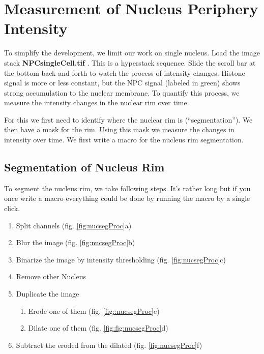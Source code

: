 \section{Measurement of Nucleus Periphery Intensity}

To simplify the development, we limit our work on single nucleus. Load the image stack \textbf{NPCsingleCell.tif} . This is a hyperstack sequence. Slide the scroll bar at the bottom back-and-forth to watch the process of intensity changes. Histone signal is more or less constant, but the NPC signal (labeled in green) shows strong accumulation to the nuclear membrane. To quantify this process, we measure the intensity changes in the nuclear rim over time.

For this we first need to identify where the nuclear rim is (``segmentation''). We then have a mask for the rim. Using this mask we measure the changes in intensity over time. We first write a macro for the nucleus rim segmentation.

\subsection{Segmentation of Nucleus Rim}

To segment the nucleus rim, we take following steps. It's rather long but if you once write a macro everything could be done by running the macro by a single click.

\begin{enumerate}
  \item Split channels (fig. \ref{fig:nucsegProc}a)
  \item Blur the image (fig. \ref{fig:nucsegProc}b)
  \item Binarize the image by intensity thresholding (fig. \ref{fig:nucsegProc}c)
  \item Remove other Nucleus
  \item Duplicate the image
  \begin{enumerate}
    \item Erode one of them (fig. \ref{fig::nucsegProc}e)
    \item Dilate one of them (fig. \ref{fig:fig:nucsegProc}d)
  \end{enumerate}
  \item Subtract the eroded from the dilated (fig. \ref{fig:nucsegProc}f)
\end{enumerate}